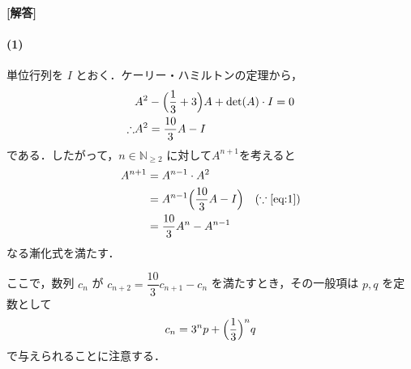 \documentclass[../../main.tex]{subfiles}
\begin{document}
\begin{oframed}
  
\end{oframed}

{\bf [解答]}

\paragraph{(1)}
単位行列を $I$ とおく．ケーリー・ハミルトンの定理から，
\begin{align}
  & A^2 - \Bigl(\dfrac{1}{3} + 3\Bigr) A + \det(A) \cdot I = 0 \\
  \therefore
  &A^2 = \dfrac{10}{3}A - I \label{eq:1}
\end{align}
である．したがって，$n \in \mathbb{N}_{\ge 2}$ に対して$A^{n+1}$を考えると
\begin{align}
  A^{n+1}
  &= A^{n-1} \cdot A^2 \\
  &= A^{n-1} \Bigl( \dfrac{10}{3} A - I \Bigr) \quad (\because \text{\cref{eq:1}})\\
  &= \dfrac{10}{3} A^n - A^{n-1} \label{eq:2}
\end{align}
なる漸化式を満たす．

ここで，数列 $c_n$ が $c_{n+2} = \dfrac{10}{3} c_{n+1} - c_n$ を満たすとき，その一般項は $p, q$ を定数として
\begin{align}
  c_n = 3^n p + \Bigl(\dfrac{1}{3}\Bigr)^n q
\end{align}
で与えられることに注意する．
\end{document}
